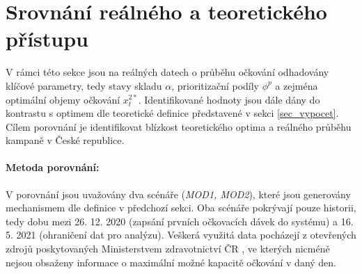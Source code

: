 %

\section*{Srovnání reálného a teoretického přístupu}

%
V rámci této sekce jsou na reálných datech o průběhu očkování odhadovány klíčové parametry, tedy stavy skladu $\alpha$, prioritizační podíly $\phi^{p}$ a zejména optimální objemy očkování $x_{t}^{2*}$. Identifikované hodnoty jsou dále dány do kontrastu s optimem dle teoretické definice představené v sekci \ref{sec_vypocet}. 
Cílem porovnání je identifikovat blízkost teoretického optima a reálného průběhu kampaně v České republice.




\paragraph{Metoda porovnání: }\label{sec:comparison}V porovnání jsou uvažovány dva scénáře (\emph{MOD1, MOD2}), které  jsou generovány mechanismem dle definice v předchozí sekci. Oba scénáře pokrývají pouze historii, tedy dobu mezi 26. 12. 2020 (zapsání prvních očkovacích dávek do systému) a 16. 5. 2021 (ohraničení dat pro analýzu).
Veškerá využitá data pocházejí z otevřených zdrojů poskytovaných Ministerstvem zdravotnictví ČR \cite{mzcr_data}, ve kterých nicméně nejsou obsaženy informace o maximální možné kapacitě očkování v daný den. 





